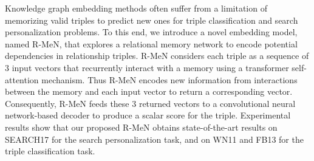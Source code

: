 Knowledge graph embedding methods often suffer from a limitation of memorizing valid triples to predict new ones for triple classification and search personalization problems. To this end, we introduce a novel embedding model, named R-MeN, that explores a relational memory network to encode potential dependencies in relationship triples. R-MeN considers each triple as a sequence of 3 input vectors that recurrently interact with a memory using a transformer self-attention mechanism. Thus R-MeN encodes new information from interactions between the memory and each input vector to return a corresponding vector. Consequently, R-MeN feeds these 3 returned vectors to a convolutional neural network-based decoder to produce a scalar score for the triple. Experimental results show that our proposed R-MeN obtains state-of-the-art results on SEARCH17 for the search personalization task, and on WN11 and FB13 for the triple classification task.
